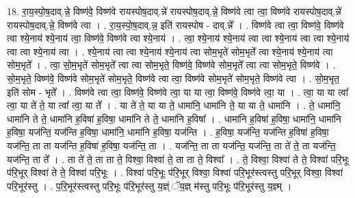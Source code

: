 \documentclass[17pt]{extarticle}
\begin{document}
18. रा॒य॒स्पो॒ष॒दाव्.न्ने॒ विष्ण॑वे॒ विष्ण॑वे रायस्पोष॒दाव्.न्ने॑ रायस्पोष॒दाव्.न्ने॒ विष्ण॑वे त्वा त्वा॒ विष्ण॑वे रायस्पोष॒दाव्.न्ने॑ रायस्पोष॒दाव्.न्ने॒ विष्ण॑वे त्वा । . रा॒य॒स्पो॒ष॒दाव्.न्न॒ इति॑ रायस्पोष - दाव्.न्ने᳚ । . विष्ण॑वे त्वा त्वा॒ विष्ण॑वे॒ विष्ण॑वे त्वा श्ये॒नाय॑ श्ये॒नाय॑ त्वा॒ विष्ण॑वे॒ विष्ण॑वे त्वा श्ये॒नाय॑ । . त्वा॒ श्ये॒नाय॑ श्ये॒नाय॑ त्वा त्वा श्ये॒नाय॑ त्वा त्वा श्ये॒नाय॑ त्वा त्वा श्ये॒नाय॑ त्वा । . श्ये॒नाय॑ त्वा त्वा श्ये॒नाय॑ श्ये॒नाय॑ त्वा सोम॒भृते॑ सोम॒भृते᳚ त्वा श्ये॒नाय॑ श्ये॒नाय॑ त्वा सोम॒भृते᳚ । . त्वा॒ सो॒म॒भृते॑ सोम॒भृते᳚ त्वा त्वा सोम॒भृते॒ विष्ण॑वे॒ विष्ण॑वे सोम॒भृते᳚ त्वा त्वा सोम॒भृते॒ विष्ण॑वे । . सो॒म॒भृते॒ विष्ण॑वे॒ विष्ण॑वे सोम॒भृते॑ सोम॒भृते॒ विष्ण॑वे त्वा त्वा॒ विष्ण॑वे सोम॒भृते॑ सोम॒भृते॒ विष्ण॑वे त्वा । . सो॒म॒भृत॒ इति॑ सोम - भृते᳚ । . विष्ण॑वे त्वा त्वा॒ विष्ण॑वे॒ विष्ण॑वे त्वा॒ या या त्वा॒ विष्ण॑वे॒ विष्ण॑वे त्वा॒ या । . त्वा॒ या या त्वा᳚ त्वा॒ या ते॑ ते॒ या त्वा᳚ त्वा॒ या ते᳚ । . या ते॑ ते॒ या या ते॒ धामा॑नि॒ धामा॑नि ते॒ या या ते॒ धामा॑नि । . ते॒ धामा॑नि॒ धामा॑नि ते ते॒ धामा॑नि ह॒विषा॑ ह॒विषा॒ धामा॑नि ते ते॒ धामा॑नि ह॒विषा᳚ । . धामा॑नि ह॒विषा॑ ह॒विषा॒ धामा॑नि॒ धामा॑नि ह॒विषा॒ यज॑न्ति॒ यज॑न्ति ह॒विषा॒ धामा॑नि॒ धामा॑नि ह॒विषा॒ यज॑न्ति । . ह॒विषा॒ यज॑न्ति॒ यज॑न्ति ह॒विषा॑ ह॒विषा॒ यज॑न्ति॒ ता ता यज॑न्ति ह॒विषा॑ ह॒विषा॒ यज॑न्ति॒ ता । . यज॑न्ति॒ ता ता यज॑न्ति॒ यज॑न्ति॒ ता ते॑ ते॒ ता यज॑न्ति॒ यज॑न्ति॒ ता ते᳚ । . ता ते॑ ते॒ ता ता ते॒ विश्वा॒ विश्वा॑ ते॒ ता ता ते॒ विश्वा᳚ । . ते॒ विश्वा॒ विश्वा॑ ते ते॒ विश्वा॑ परि॒भूः प॑रि॒भूर् विश्वा॑ ते ते॒ विश्वा॑ परि॒भूः । . विश्वा॑ परि॒भूः प॑रि॒भूर् विश्वा॒ विश्वा॑ परि॒भूर॑स्त्वस्तु परि॒भूर् विश्वा॒ विश्वा॑ परि॒भूर॑स्तु । . प॒रि॒भूर॑स्त्वस्तु परि॒भूः प॑रि॒भूर॑स्तु य॒ज्ञ्ं ॅय॒ज्ञ् म॑स्तु परि॒भूः प॑रि॒भूर॑स्तु य॒ज्ञ्म् । \newline
\end{document}
